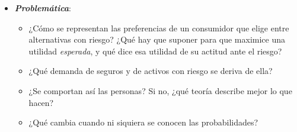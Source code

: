 \documentclass[11pt]{article}
\begin{document}
\begin{itemize}
\begin{itemize}
  \item Pronto llegan las anomalías: \textcite{Allais1953Comportement}, con riesgo,\footnote{ recibió el Premio Nobel de Economía en 1988 «por sus contribuciones pioneras a la teoría de los mercados y a la utilización eficiente de los recursos»\nocite{Nobel1988Allais}: no por la paradoja que lleva su nombre.} y \textcite{Ellsberg1961Risk}, con incertidumbre, proponen elecciones habituales que ninguna utilidad esperada racionaliza. De ellas nacen la  de \textcite{KahnemanTversky1979Prospect}, reformulada en \textcite{TverskyKahneman1992Advances}, que valió a  el Premio Nobel de Economía de 2002,\footnote{«Por haber integrado en la ciencia económica aportaciones de la investigación psicológica, en especial sobre el juicio humano y la toma de decisiones en condiciones de incertidumbre»\nocite{Nobel2002Kahneman}. Lo compartió con , premiado por convertir los experimentos de laboratorio en una herramienta del análisis económico.  había fallecido en 1996, y el premio no se concede a título póstumo.} y los modelos de aversión a la \emph{ambigüedad} de \textcite{Schmeidler1989Subjective} y \textcite{GilboaSchmeidler1989Maxmin}.
  \end{itemize}

\item \textbf{\emph{Problemática}}:
  \begin{itemize}
  \item ¿Cómo se representan las preferencias de un consumidor que elige entre alternativas con riesgo? ¿Qué hay que suponer para que maximice una utilidad \emph{esperada}, y qué dice esa utilidad de su actitud ante el riesgo?
  \item ¿Qué demanda de seguros y de activos con riesgo se deriva de ella?
  \item ¿Se comportan así las personas? Si no, ¿qué teoría describe mejor lo que hacen?
  \item ¿Qué cambia cuando ni siquiera se conocen las probabilidades?
  \end{itemize}


\end{itemize}
\end{document}

